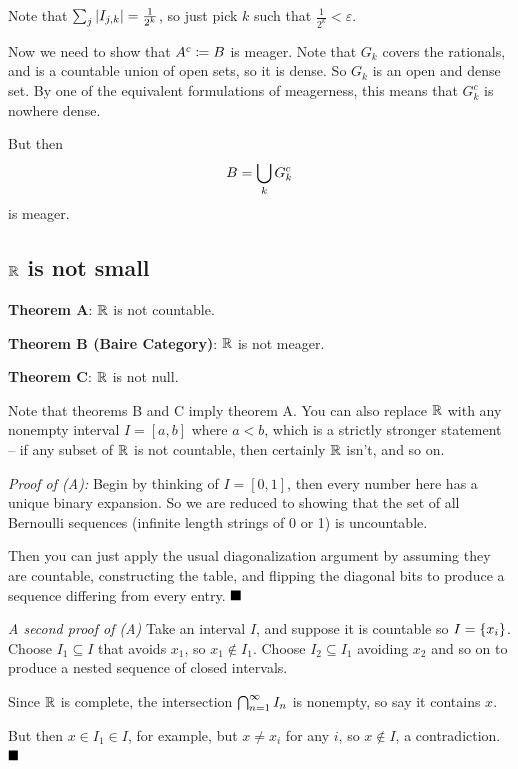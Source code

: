 Note that \(\sum_j {\left\lvert {I_{j, k}} \right\rvert} = \frac{1} {2^k}\), so just pick \(k\)
such that \(\frac 1 {2^k} < \varepsilon\).

Now we need to show that \(A^c \coloneqq B\) is meager. Note that
\(G_k\) covers the rationals, and is a countable union of open sets, so
it is dense. So \(G_k\) is an open and dense set. By one of the
equivalent formulations of meagerness, this means that \(G_k^c\) is
nowhere dense.

But then
\begin{align*}
B = \bigcup_k G_k^c
\end{align*} is meager.

\hypertarget{rr-is-not-small}{%
\subsection{\texorpdfstring{\({\mathbb{R}}\) is not
small}{\textbackslash RR is not small}}\label{rr-is-not-small}}

\textbf{Theorem A}: \({\mathbb{R}}\) is not countable.

\textbf{Theorem B (Baire Category)}: \({\mathbb{R}}\) is not meager.

\textbf{Theorem C}: \({\mathbb{R}}\) is not null.

Note that theorems B and C imply theorem A. You can also replace \({\mathbb{R}}\)
with any nonempty interval \(I = [a,b]\) where \(a< b\), which is a
strictly stronger statement -- if any subset of \({\mathbb{R}}\) is not
countable, then certainly \({\mathbb{R}}\) isn't, and so on.

\emph{Proof of (A):} Begin by thinking of \(I = [0,1]\), then every
number here has a unique binary expansion. So we are reduced to showing
that the set of all Bernoulli sequences (infinite length strings of 0 or
1) is uncountable.

Then you can just apply the usual diagonalization argument by assuming
they are countable, constructing the table, and flipping the diagonal
bits to produce a sequence differing from every entry. \(\qed\)

\emph{A second proof of (A)} Take an interval \(I\), and suppose it is
countable so \(I = \left\{{x_i}\right\}\). Choose \(I_1 \subseteq I\) that
avoids \(x_1\), so \(x_1\not\in I_1\). Choose \(I_2 \subseteq I_1\)
avoiding \(x_2\) and so on to produce a nested sequence of closed
intervals.

Since \({\mathbb{R}}\) is complete, the intersection
\(\bigcap_{n=1}^\infty I_n\) is nonempty, so say it contains \(x\).

But then \(x\in I_1 \in I\), for example, but \(x\neq x_i\) for any
\(i\), so \(x\not\in I\), a contradiction. \(\qed\)

